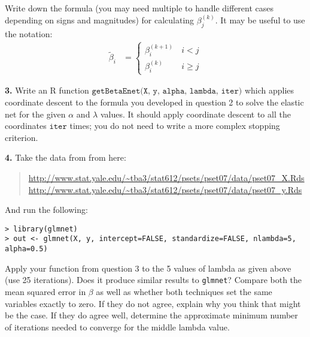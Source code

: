 \documentclass[12pt]{article}
\begin{document}
Write down the formula (you may need multiple to handle different cases depending on signs and
magnitudes) for calculating $\beta^{(k)}_j$. It may be useful to use the notation:
\begin{align*}
\widetilde{\beta}_i &= \left\{ \begin{array}{cc} \beta^{(k+1)}_i \, &i < j \\ \beta^{(k)}_i \, &i \geq j \end{array} \right.
\end{align*}

\textbf{3.} Write an R function $\texttt{getBetaEnet(X, y, alpha, lambda, iter)}$ which
applies coordinate descent to the formula you developed in question 2 to solve the elastic
net for the given $\alpha$ and $\lambda$ values. It should apply coordinate descent to all
the coordinates $\texttt{iter}$ times; you do not need to write a more complex stopping criterion.

\textbf{4.} Take the data from from here:
\begin{quote}
\url{http://www.stat.yale.edu/~tba3/stat612/psets/pset07/data/pset07_X.Rds}
\url{http://www.stat.yale.edu/~tba3/stat612/psets/pset07/data/pset07_y.Rds}
\end{quote}
And run the following:
\begin{verbatim}
> library(glmnet)
> out <- glmnet(X, y, intercept=FALSE, standardize=FALSE, nlambda=5, alpha=0.5)
\end{verbatim}
Apply your function from question $3$ to the 5 values of lambda as given above (use 25 iterations).
Does it produce similar results to \texttt{glmnet}? Compare both the mean squared error
in $\beta$ as well as whether both techniques set the same variables exactly to zero. If they
do not agree, explain why you think that might be the case. If they do agree well, determine the
approximate minimum number of iterations needed to converge for the middle lambda value.

\end{document}
